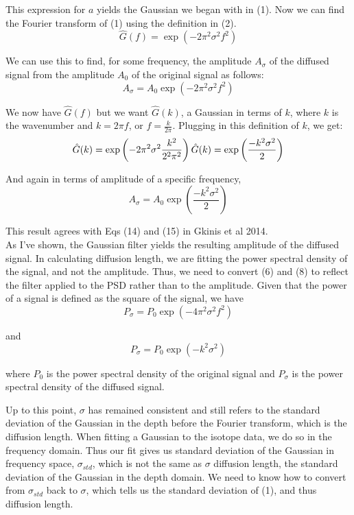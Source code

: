 \documentclass[draft, jgrga]{AGUTeX}
\begin{document}
\begin{article}
This expression for $a$ yields the Gaussian we began with in (1). Now we can find the Fourier transform of (1) using the definition in (2).
\begin{equation}
  \hat{G}(f) = \exp\left(-2\pi^{2}\sigma^{2}f^{2}\right)
\end{equation}

We can use this to find, for some frequency, the amplitude $A_\sigma$ of the diffused signal from the amplitude $A_0$ of the original signal as follows:
\begin{equation}
  A_\sigma = A_0 \exp \left(-2 \pi^2 \sigma^2 f^2 \right)
\end{equation}

We now have $\hat{G}(f)$ but we want $\hat{G}(k)$, a Gaussian in terms of $k$, where $k$ is the wavenumber and $k = 2 \pi f$, or $f = \frac{k}{2\pi}$. Plugging in this definition of $k$, we get:
\begin{equation}
  \hat{G}(k) = \exp\left(-2\pi^{2}\sigma^{2}\frac{k^{2}}{2^{2}\pi^{2}}\right)\\
  \hat{G}(k) = \exp\left(\frac{-k^{2}\sigma^{2}}{2}\right)
\end{equation}

And again in terms of amplitude of a specific frequency,
\begin{equation}
  A_\sigma = A_0 \exp \left(\frac{-k^2\sigma^2}{2}\right)
\end{equation}

This result agrees with Eqs (14) and (15) in Gkinis et al 2014.\\
As I've shown, the Gaussian filter yields the resulting amplitude of the diffused signal. In calculating diffusion length, we are fitting the power spectral density of the signal, and not the amplitude. Thus, we need to convert (6) and (8) to reflect the filter applied to the PSD rather than to the amplitude. Given that the power of a signal is defined as the square of the signal, we have
\begin{equation}
  P_\sigma = P_0 \exp \left(-4\pi^2\sigma^2f^2\right)
\end{equation}

and
\begin{equation}
  P_\sigma = P_0 \exp \left(-k^2 \sigma^2\right)
\end{equation}

where $P_0$ is the power spectral density of the original signal and $P_\sigma$ is the power spectral density of the diffused signal.

Up to this point, $\sigma$ has remained consistent and still refers to the standard deviation of the Gaussian in the depth before the Fourier transform, which is the diffusion length. When fitting a Gaussian to the isotope data, we do so in the frequency domain. Thus our fit gives us standard deviation of the Gaussian in frequency space, $\sigma_{std}$, which is not the same as $\sigma$ diffusion length, the standard deviation of the Gaussian in the depth domain. We need to know how to convert from $\sigma_{std}$ back to $\sigma$, which tells us the standard deviation of (1), and thus diffusion length.


\end{article}
\end{document}
